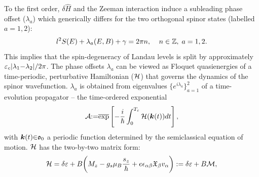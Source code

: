 \documentclass[aps, prb, showpacs, twocolumn, notitlepage, superscriptaddress]{revtex4-1}
\begin{document}

To the first order, $\delta \hat{H}$ and the Zeeman interaction induce a subleading phase offset ($\lambda_a$) which generically differs for the two orthogonal spinor states (labelled $a{=}1,2$):
\begin{equation}
l^2S(E)+\lambda_a(E,B)+\gamma=2\pi n,\;\;\;\;  n\in \mathbb{Z},\;a=1,2. \label{eq:rule}
\end{equation}
This implies that the spin-degeneracy of Landau levels is split by approximately  $\varepsilon_c|\lambda_1{-}\lambda_2|/2\pi$. The phase offsets $\lambda_a$ can be viewed as Floquet quasienergies\cite{shirley_solution_1965} of a time-periodic, perturbative Hamiltonian (${\cal H}$) that governs the dynamics of the spinor wavefunction.  $\lambda_a$ is obtained  from  eigenvalues $\{e^{i\lambda_a}\}_{a=1}^2$ of a time-evolution propagator -- the time-ordered exponential 
\begin{equation}
{\cal A}{:}{=}\overline{\exp}\left[-\frac{i}{\hbar}\int_0^{T_c} {\cal H}(\boldsymbol{k}(t)) dt\right],
\label{eq:prop}
\end{equation} 
with $\boldsymbol{k}(t){\in}\mathfrak{o}_0$ a periodic function determined by the semiclassical equation of motion.   ${\cal H}$ has the two-by-two matrix form:
\begin{equation}
  {\cal H}=\delta \varepsilon +B\bigg(M_z -g_s\mu_{B}\frac{s_z}{\hbar} + e\epsilon_{\alpha\beta}\mathfrak{X}_{\beta}v_{\alpha}\bigg):=\delta \varepsilon+B{\cal M},\label{eq:H1}
\end{equation}
\end{document}
